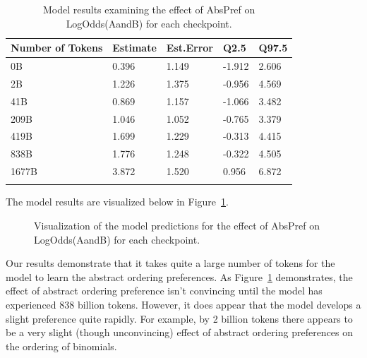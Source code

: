 \documentclass[
  nottoc]{article}
\begin{document}
\begin{longtable}[]{@{}lllll@{}}

\toprule\noalign{}
Number of Tokens & Estimate & Est.Error & Q2.5 & Q97.5 \\
\midrule\noalign{}
\endhead
\bottomrule\noalign{}
\endlastfoot
0B & 0.396 & 1.149 & -1.912 & 2.606 \\
2B & 1.226 & 1.375 & -0.956 & 4.569 \\
41B & 0.869 & 1.157 & -1.066 & 3.482 \\
209B & 1.046 & 1.052 & -0.765 & 3.379 \\
419B & 1.699 & 1.229 & -0.313 & 4.415 \\
838B & 1.776 & 1.248 & -0.322 & 4.505 \\
1677B & 3.872 & 1.520 & 0.956 & 6.872 \\


\caption{\label{tbl-exp2m1}Model results examining the effect of AbsPref
on LogOdds(AandB) for each checkpoint.}

\tabularnewline
\end{longtable}

The model results are visualized below in Figure~\ref{fig-exp2m1}.

\begin{figure}


\caption{\label{fig-exp2m1}Visualization of the model predictions for
the effect of AbsPref on LogOdds(AandB) for each checkpoint.}

\end{figure}%

Our results demonstrate that it takes quite a large number of tokens for
the model to learn the abstract ordering preferences. As
Figure~\ref{fig-exp2m1} demonstrates, the effect of abstract ordering
preference isn't convincing until the model has experienced 838 billion
tokens. However, it does appear that the model develops a slight
preference quite rapidly. For example, by 2 billion tokens there appears
to be a very slight (though unconvincing) effect of abstract ordering
preferences on the ordering of binomials.
\end{document}
